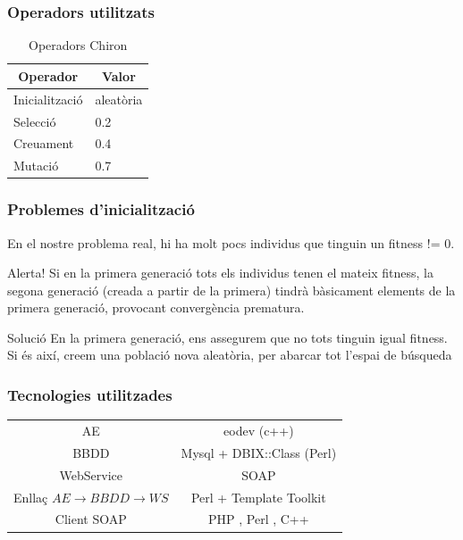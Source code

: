 \documentclass{beamer}
\begin{document}
\begin{frame}
\frametitle{Operadors utilitzats}


\begin{table}
\centering
\begin{tabular}{|l|l|}
\hline
\multicolumn{1}{|c|}{\textbf{Operador }} & \multicolumn{1}{c|}{\textbf{ Valor}} \\
\hline
\hline
Inicialització & aleatòria \\
Selecció       & 0.2        \\
Creuament       & 0.4        \\
Mutació        & 0.7        \\
\hline
\end{tabular}
\caption{Operadors Chiron}
\end{table}
\end{frame}

\begin{frame}
\frametitle{Problemes d'inicialització}
En el nostre problema real, hi ha molt pocs individus que tinguin un fitness !=
0.
\pause
\begin{alertblock}{Alerta!}
Si en la primera generació tots els individus tenen el mateix fitness, la segona
generació (creada a partir de la primera) tindrà bàsicament elements de la
primera generació, provocant convergència prematura.
\end{alertblock}
\pause
\begin{exampleblock}{Solució}
En la primera generació, ens assegurem que no tots tinguin igual fitness.  Si és
així, creem una població nova aleatòria, per abarcar tot l'espai de búsqueda
\end{exampleblock}
\end{frame}

\begin{frame}
\frametitle{Tecnologies utilitzades}
\begin{tabular}[h!]{|c|c|}
AE & eodev (c++) \\
BBDD & Mysql + DBIX::Class (Perl) \\
WebService & SOAP \\
Enllaç $AE\rightarrow BBDD\rightarrow WS$ & Perl + Template Toolkit\\
Client SOAP & PHP , Perl , C++ \\
\end{tabular}
\end{frame}
\end{document}
